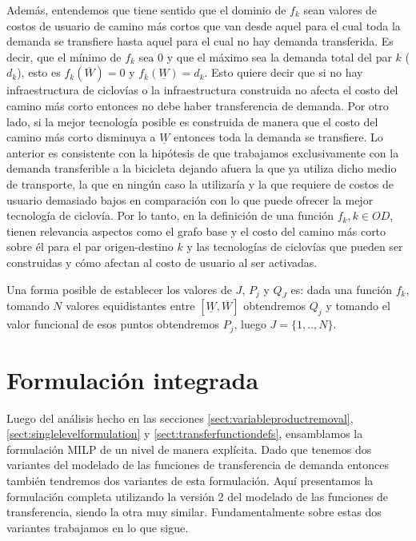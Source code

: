 Además, entendemos que tiene sentido que el dominio de $f_k$ sean valores de costos de usuario de camino más cortos que van desde aquel para el cual toda la demanda se transfiere hasta aquel para el cual no hay demanda transferida. Es decir, que el mínimo de $f_k$ sea 0 y que el máximo sea la demanda total del par $k$ ($d_k$), esto es $f_k(\overline{W}) = 0$ y $f_k(\underline{W}) = d_k$. Esto quiere decir que si no hay infraestructura de ciclovías o la infraestructura construida no afecta el costo del camino más corto entonces no debe haber transferencia de demanda. Por otro lado, si la mejor tecnología posible es construida de manera que el costo del camino más corto disminuya a $\underline{W}$ entonces toda la demanda se transfiere. Lo anterior es consistente con la hipótesis de que trabajamos exclusivamente con la demanda transferible a la bicicleta dejando afuera la que ya utiliza dicho medio de transporte, la que en ningún caso la utilizaría y la que requiere de costos de usuario demasiado bajos en comparación con lo que puede ofrecer la mejor tecnología de ciclovía. Por lo tanto, en la definición de una función $f_k, k \in OD$, tienen relevancia aspectos como el grafo base y el costo del camino más corto sobre él para el par origen-destino $k$ y las tecnologías de ciclovías que pueden ser construidas y cómo afectan al costo de usuario al ser activadas.

Una forma posible de establecer los valores de $J$, $P_j$ y $Q_J$ es: dada una función $f_k$, tomando $N$ valores equidistantes entre $[\underline{W}, \overline{W}]$ obtendremos $Q_j$ y tomando el valor funcional de esos puntos obtendremos $P_j$, luego $J=\{1,..,N\}$.

\section{Formulación integrada}
\label{sect:alltogether}

Luego del análisis hecho en las secciones \ref{sect:variableproductremoval}, \ref{sect:singlelevelformulation} y \ref{sect:transferfunctiondefs}, ensamblamos la formulación MILP de un nivel de manera explícita. Dado que tenemos dos variantes del modelado de las funciones de transferencia de demanda entonces también tendremos dos variantes de esta formulación. Aquí presentamos la formulación completa utilizando la versión 2 del modelado de las funciones de transferencia, siendo la otra muy similar. Fundamentalmente sobre estas dos variantes trabajamos en lo que sigue.

